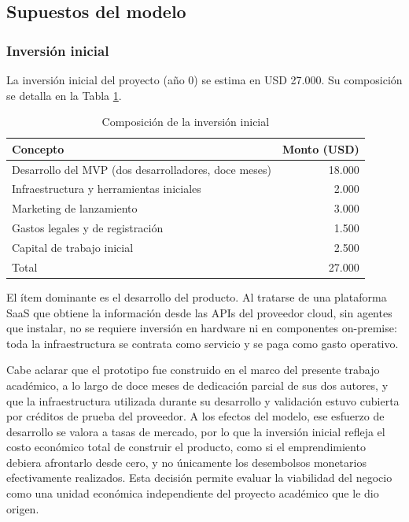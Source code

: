 \subsection{Supuestos del modelo}

\subsubsection{Inversión inicial}

La inversión inicial del proyecto (año 0) se estima en USD 27.000. Su composición se detalla en la Tabla \ref{tab:inversion-inicial}.

\begin{table}[H]
\centering
\begin{tabular}{l r}
\hline
Concepto & Monto (USD) \\
\hline
Desarrollo del MVP (dos desarrolladores, doce meses) & 18.000 \\
Infraestructura y herramientas iniciales & 2.000 \\
Marketing de lanzamiento & 3.000 \\
Gastos legales y de registración & 1.500 \\
Capital de trabajo inicial & 2.500 \\
\hline
Total & 27.000 \\
\hline
\end{tabular}
\caption{Composición de la inversión inicial}
\label{tab:inversion-inicial}
\end{table}

El ítem dominante es el desarrollo del producto. Al tratarse de una plataforma SaaS que obtiene la información desde las APIs del proveedor cloud, sin agentes que instalar, no se requiere inversión en hardware ni en componentes on-premise: toda la infraestructura se contrata como servicio y se paga como gasto operativo.

Cabe aclarar que el prototipo fue construido en el marco del presente trabajo académico, a lo largo de doce meses de dedicación parcial de sus dos autores, y que la infraestructura utilizada durante su desarrollo y validación estuvo cubierta por créditos de prueba del proveedor. A los efectos del modelo, ese esfuerzo de desarrollo se valora a tasas de mercado, por lo que la inversión inicial refleja el costo económico total de construir el producto, como si el emprendimiento debiera afrontarlo desde cero, y no únicamente los desembolsos monetarios efectivamente realizados. Esta decisión permite evaluar la viabilidad del negocio como una unidad económica independiente del proyecto académico que le dio origen.

